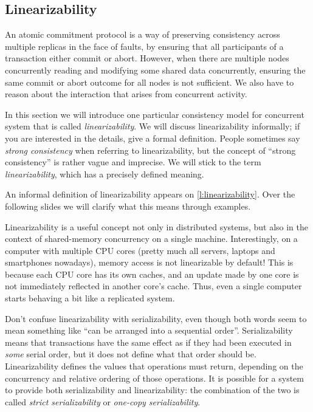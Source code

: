 \subsection{Linearizability}\label{sec:linearizability}

An atomic commitment protocol is a way of preserving consistency across multiple replicas in the face of faults, by ensuring that all participants of a transaction either commit or abort.
However, when there are multiple nodes concurrently reading and modifying some shared data concurrently, ensuring the same commit or abort outcome for all nodes is not sufficient.
We also have to reason about the interaction that arises from concurrent activity.

In this section we will introduce one particular consistency model for concurrent system that is called \emph{linearizability}.
We will discuss linearizability informally; if you are interested in the details, \cite{Herlihy:1990} give a formal definition.
People sometimes say \emph{strong consistency} when referring to linearizability, but the concept of ``strong consistency'' is rather vague and imprecise.
We will stick to the term \emph{linearizability}, which has a precisely defined meaning.

An informal definition of linearizability appears on \autoref{l:linearizability}.
Over the following slides we will clarify what this means through examples.

Linearizability is a useful concept not only in distributed systems, but also in the context of shared-memory concurrency on a single machine.
Interestingly, on a computer with multiple CPU cores (pretty much all servers, laptops and smartphones nowadays), memory access is not linearizable by default!
This is because each CPU core has its own caches, and an update made by one core is not immediately reflected in another core's cache.
Thus, even a single computer starts behaving a bit like a replicated system.

Don't confuse linearizability with serializability, even though both words seem to mean something like ``can be arranged into a sequential order''.
Serializability means that transactions have the same effect as if they had been executed in \emph{some} serial order, but it does not define what that order should be.
Linearizability defines the values that operations must return, depending on the concurrency and relative ordering of those operations.
It is possible for a system to provide both serializability and linearizability: the combination of the two is called \emph{strict serializability} or \emph{one-copy serializability}.

